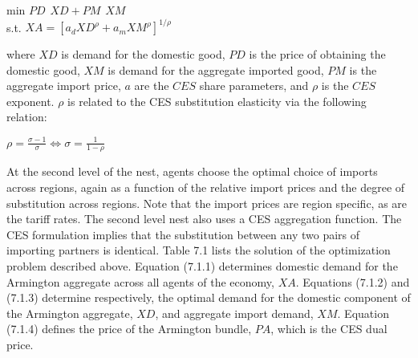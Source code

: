 \documentclass{article}
\begin{document}
\begin{center}

min \hspace{30pt} $PD \hspace{5pt} XD + PM \hspace{5pt} XM$\\[20pt]
s.t. \hspace{5pt} $XA = \left[a_dXD^\rho + a_mXM^\rho\right]^{1/\rho}$

\end{center}

where $XD$ is demand for the domestic good, $PD$ is the price of obtaining the domestic good, $XM$ is demand for the aggregate imported good, $PM$ is the aggregate import price, $a$ are the $CES$ share parameters, and $\rho$ is the $CES$ exponent. $\rho$ is related to the CES substitution elasticity via the following relation:

\begin{center}

$\rho = \frac{\sigma - 1}{\sigma} \Longleftrightarrow \sigma = \frac{1}{1-\rho}$

\end{center}

At the second level of the nest, agents choose the optimal choice of imports across regions, again as a function of the relative import prices and the degree of substitution across regions. Note that the import prices are region specific, as are the tariff rates. The second level nest also uses a CES aggregation function. The CES formulation implies that the substitution between any two pairs of importing partners is identical. Table 7.1 lists the solution of the optimization problem described above. Equation (7.1.1) determines domestic demand for the Armington aggregate across all agents of the economy, $XA$. Equations (7.1.2) and (7.1.3) determine respectively, the optimal demand for the domestic component of the Armington aggregate, $XD$, and aggregate import demand, $XM$. Equation (7.1.4) defines the price of the Armington bundle, $PA$, which is the CES dual price.
\end{document}
